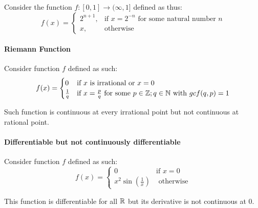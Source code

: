 \documentclass[../note.tex]{subfiles}
\begin{document}
Consider the function $f:[0,1] \rightarrow (\infty, 1]$ defined as thus:
\[
    f(x)= 
\begin{cases}
	2^{n+1},& \text{if } x=2^{-n} \text{ for some natural number }n\\
    x,              & \text{otherwise}
\end{cases}
\]


\paragraph{Riemann Function} \label{RiemannFunction} \hypertarget{RiemannFunction}{}
Consider function $f$ defined as such:
\[
	f(x)=
	\begin{cases}
		0 & \text{if } x \text{ is irrational or } x=0 \\
		\frac{1}{q} & \text{if } x=\frac{p}{q} \text{ for some } p \in \mathbb{Z}; q \in \mathbb{N} \text{ with } gcf(q, p)=1  \\ 
	\end{cases}
\]

Such function is continuous at every irrational point but not continuous at rational point.

\paragraph{Differentiable but not continuously differentiable}
Consider function $f$ defined as such:
\[
	f(x)=
	\begin{cases}
		0 & \text{if } x=0 \\
		x^2\sin(\frac{1}{x}) & \text{ otherwise}
	\end{cases}
\]

This function is differentiable for all $\mathbb{R}$ but its derivative is not continuous at $0$.
\end{document}
